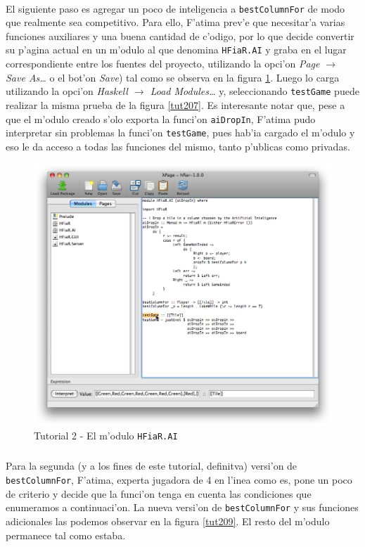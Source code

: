 \documentclass[a4paper]{article}
\begin{document}
\paragraph{}El siguiente paso es agregar un poco de inteligencia a \texttt{bestColumnFor} de modo que realmente sea competitivo.  Para ello, F'atima prev'e que necesitar'a varias funciones auxiliares y una buena cantidad de c'odigo, por lo que decide convertir su p'agina actual en un m'odulo al que denomina \texttt{HFiaR.AI} y graba en el lugar correspondiente entre los fuentes del proyecto, utilizando la opci'on \textsl{Page $\rightarrow$ Save As\ldots} o el bot'on \textsl{Save}) tal como se observa en la figura \ref{tut208}.  Luego lo carga utilizando la opci'on \textsl{Haskell $\rightarrow$ Load Modules\ldots} y, seleccionando \texttt{testGame} puede realizar la misma prueba de la figura \ref{tut207}.  Es interesante notar que, pese a que el m'odulo creado s'olo exporta la funci'on \texttt{aiDropIn}, F'atima pudo interpretar sin problemas la funci'on \texttt{testGame}, pues hab'ia cargado el m'odulo y eso le da acceso a todas las funciones del mismo, tanto p'ublicas como privadas.
\begin{figure}[hp]
	\begin{center}
        	\includegraphics[width=.75\textwidth]{pictures/tut2/08}
		\caption{Tutorial 2 - El m'odulo \texttt{HFiaR.AI}}
		\label{tut208}
	\end{center}
\end{figure}
\newpage
\subparagraph{}Para la segunda (y a los fines de este tutorial, definitva) versi'on de \texttt{bestColumnFor}, F'atima, experta jugadora de 4 en l'inea como es, pone un poco de criterio y decide que la funci'on tenga en cuenta las condiciones que enumeramos a continuaci'on.  La nueva versi'on de \texttt{bestColumnFor} y sus funciones adicionales las podemos observar en la figura \ref{tut209}.  El resto del m'odulo permanece tal como estaba.
\end{document}
